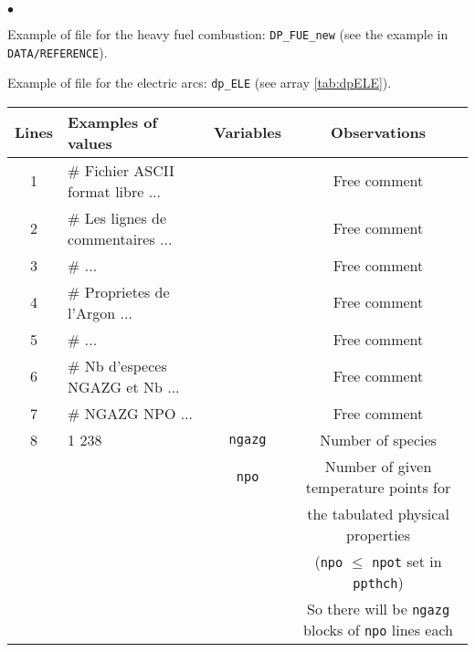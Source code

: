 {{\begin{list}{$\bullet$}{}
       \item Example of file for the heavy fuel combustion: \texttt{DP\_FUE\_new} (see
             the example in \texttt{DATA/REFERENCE}).

       \item Example of file for the electric arcs: \texttt{dp\_ELE} (see
             array \ref{tab:dpELE}).

\begin{table}[htbp]
\begin{center}
\small{
\begin{tabular}{|c|l|c|c|} \hline
 Lines  &        Examples of values        & Variables & Observations                                       \\ \hline
  1     &\# Fichier ASCII format libre ... &           & Free comment                                       \\ \hline
  2     &\# Les lignes de commentaires ... &           & Free comment                                       \\ \hline
  3     &\#                            ... &           & Free comment                                       \\ \hline
  4     &\#   Proprietes de l'Argon    ... &           & Free comment                                       \\ \hline
  5     &\#                            ... &           & Free comment                                       \\ \hline
  6     &\# Nb d'especes NGAZG et Nb   ... &           & Free comment                                       \\ \hline
  7     &\# NGAZG NPO                  ... &           & Free comment                                       \\ \hline
  8     &    1   238         &    \texttt{ngazg\index{ngazg}}   & Number of species                         \\
        &                    &    \texttt{npo\index{npo}}       & Number of given temperature points for    \\
        &                    &                         & the tabulated physical properties                  \\
        &                    &                         & (\texttt{npo} $\leqslant$ \texttt{npot} set in \texttt{ppthch})             \\
        &                    &                         & So there will be \texttt{ngazg} blocks of \texttt{npo} lines each    \\ \hline

\end{tabular}}
\end{center}
\end{table}
\end{list}}}
